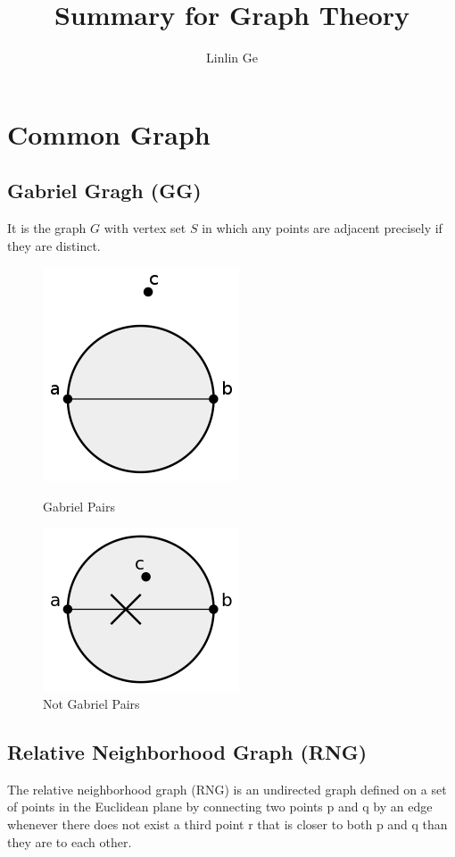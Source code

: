 \documentclass[10pt]{article}
\title{Summary for Graph Theory}
\author{Linlin Ge}
\date{}
\begin{document}
\maketitle

\section{Common Graph}
\subsection{Gabriel Gragh (GG)}
It is the graph $G$ with vertex set $S$ in which any points are adjacent precisely if they are distinct.

\begin{figure}[htbp]
\begin{minipage}[t]{0.45\linewidth}
\centering
\includegraphics[scale=0.4]{pic/Gabriel_Pairs.png}
\caption{Gabriel Pairs}
\end{minipage}%
\begin{minipage}[t]{0.45\linewidth}
\centering
\includegraphics[scale=0.4]{pic/Not_Gabriel_Pairs.png}
\caption{Not Gabriel Pairs}
\end{minipage}

\end{figure}


\subsection{Relative Neighborhood Graph (RNG)}
The relative neighborhood graph (RNG) is an undirected graph defined on a set of points in the Euclidean plane by connecting two points p and q by an edge whenever there does not exist a third point r that is closer to both p and q than they are to each other.
\end{document}
